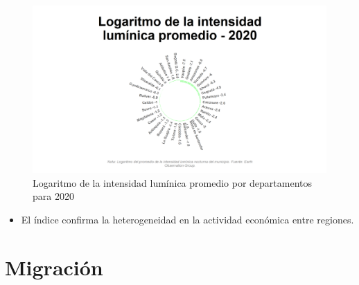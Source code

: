     \begin{figure}[H]
        \caption{Logaritmo de la intensidad lumínica promedio por departamentos para 2020 \label{map_result_2} }
        \begin{center}
        \includegraphics[width=\textwidth,keepaspectratio]{img/var_301_static.png}
        \end{center}
    \end{figure}
            \begin{itemize}
                    \item El índice confirma la heterogeneidad en la actividad económica entre regiones. 
                    \end{itemize}

\section{Migración}

